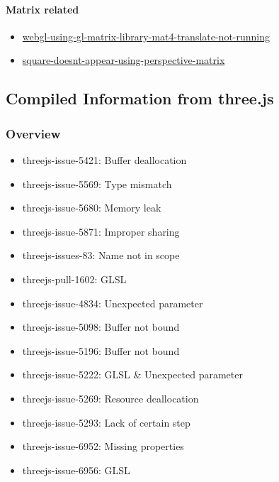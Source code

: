 \documentclass[]{article}
\begin{document}
\paragraph{Matrix related}\label{matrix-related}

\begin{itemize}
\itemsep1pt\parskip0pt
\item
  \href{http://stackoverflow.com/questions/14784427/webgl-using-gl-matrix-library-mat4-translate-not-running}{webgl-using-gl-matrix-library-mat4-translate-not-running}
\item
  \href{http://stackoverflow.com/questions/17345432/square-doesnt-appear-using-perspective-matrix}{square-doesnt-appear-using-perspective-matrix}
\end{itemize}

\subsection{Compiled Information from
three.js}\label{compiled-information-from-three.js}

\subsubsection{Overview}\label{overview-1}

\begin{itemize}
\itemsep1pt\parskip0pt
\item
  threejs-issue-5421: Buffer deallocation
\item
  threejs-issue-5569: Type mismatch
\item
  threejs-issue-5680: Memory leak
\item
  threejs-issue-5871: Improper sharing
\item
  threejs-issues-83: Name not in scope
\item
  threejs-pull-1602: GLSL
\item
  threejs-issue-4834: Unexpected parameter
\item
  threejs-issue-5098: Buffer not bound
\item
  threejs-issue-5196: Buffer not bound
\item
  threejs-issue-5222: GLSL \& Unexpected parameter
\item
  threejs-issue-5269: Resource deallocation
\item
  threejs-issue-5293: Lack of certain step
\item
  threejs-issue-6952: Missing properties
\item
  threejs-issue-6956: GLSL
\end{itemize}
\end{document}
